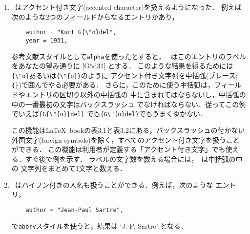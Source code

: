 \begin{enumerate}
第2に, {\tt gg-proceedings}エントリを \verb|\cite|あるい
は \verb|\nocite|で引用している
2つ以上の論文が参照していると, このエントリ
自身が \verb|\cite|あるいは \verb|\nocite|されていなくても，
\BibTeX は自動的に{\tt gg-proceedings}エントリを参考文献リストに
加える．つまり{\tt no-gnats}の他に1つ以上の論文がを
参照していると，自動的に参考文献リストに加えられる．

ただし，上記の結果となることを保証するためには，
相互参照されているエントリは，
それを引用しているすべてのエントリよりデータベースファイル中で
後ろになければならない．
従って，相互参照されているエントリは最後に置くことになる．
(さらに，残念なことだが，ネストされた相互参照
はうまく扱えない．すなわち，相互参照している先がさらに他を参照している
場合にはうまく動作しないことがある．)


最後の注意：
この相互参照機能は，現在でも利用できる，古い\BibTeX の
参照の機能とは全く関係がない．
すなわち，次のような使い方は新しい機能から何の影響も受けない．
\begin{verbatim}
    note = "Jones \cite{jones-proof} improves the result"
\end{verbatim}


\item
\BibTeX\ はアクセント付き文字(accented character)を扱えるようになった．
例えば次のような2つのフィールドからなるエントリがあり，
\begin{verbatim}
    author = "Kurt G{\"o}del",
    year = 1931,
\end{verbatim}
参考文献スタイルとして{\tt alpha}を使ったとすると，
\BibTeX\ はこのエントリのラベルをあなたの望み通りに [G{\"o}d31] とする．
このような結果を得るためには\verb|{\"o}|あるいは\verb|{\"{o}}|のように
アクセント付き文字列を中括弧(ブレース; \verb|{}|)で囲んでやる必要がある．
さらに，このために使う中括弧は，フィールドやエントリの区切り以外の中括弧の
中に含まれてはならないし，中括弧の中の一番最初の文字はバックスラッシュ
でなければならない．従ってこの例でいえば\verb|{G{\"{o}}del}|
でも\verb|{G\"{o}del}|でもうまくゆかない．

この機能は\LaTeX~bookの表3.1と表3.2にある，バックスラッシュの付かない
外国文字(foreign symbols)を除く，すべてのアクセント付き文字を扱うことができる．
この機能は利用者が定義する「アクセント付き文字」でも使える．すぐ後で例を示す．
ラベルの文字数を数える場合には，\BibTeX\ は中括弧の中の
文字列をまとめて1文字と数える．


\item
\BibTeX\ はハイフン付きの人名も扱うことができる．例えば，次のような
エントリ，
\begin{verbatim}
    author = "Jean-Paul Sartre",
\end{verbatim}
で{\tt abbrv}スタイルを使うと，結果は `J.-P. Sartre' となる．


\end{enumerate}
